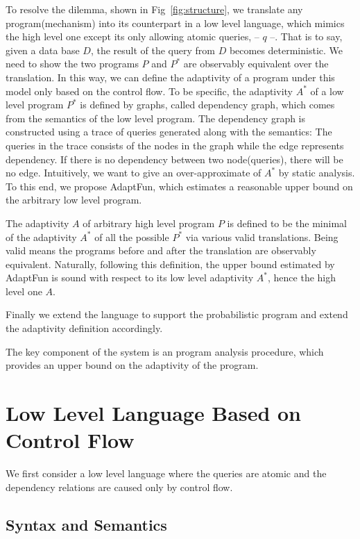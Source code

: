\documentclass[a4paper,11pt]{article}
\newcommand{\THESYSTEM}{\textsf{AdaptFun}}
\begin{document}
To resolve the dilemma, shown in Fig~\ref{fig:structure}, we translate any program(mechanism) into its counterpart in a low level language, which mimics the high level one except its only allowing atomic queries, -- $q$ --. That is to say, given a data base $D$, the result of the
query from $D$ becomes deterministic. We need to show the two programs $P$ and $P^*$ are observably equivalent over the translation. In this way, we can define the adaptivity of
a program under this model only based on the control flow.
To be specific, the adaptivity $A^*$ of a low level program $P^*$ is defined by
graphs, called dependency graph, which comes from the semantics of the low level program. The dependency graph is constructed using a
trace of queries generated along with the semantics: The queries in the trace consists of the nodes in the graph
while the edge represents dependency. If there is no dependency between
two node(queries), there will be no edge. Intuitively, we want to give an over-approximate of $A^*$ by static analysis. To this end, we propose {\THESYSTEM}, which estimates a reasonable upper bound on the arbitrary low level program.

The adaptivity $A$ of arbitrary high level program $P$ is defined to be the minimal of the adaptivity $A^*$ of all the possible $P^*$ via various valid translations. Being valid means the programs before and after the translation are observably equivalent. Naturally, following this definition, the upper bound estimated by {\THESYSTEM} is sound with respect to its low level adaptivity $A^*$, hence the high level one $A$. 


Finally we extend the language to support the probabilistic program and extend the adaptivity definition accordingly.


The key component of the system is an program analysis procedure, which provides an upper bound on the adaptivity of the program.

\section{Low Level Language Based on Control Flow}
We first consider a low level language where the queries are atomic
and the dependency relations are caused only by control flow.
%
\subsection{Syntax and Semantics}
%
\end{document}
